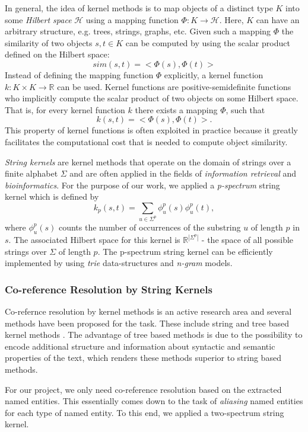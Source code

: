 In general, the idea of kernel methods is to map objects of a
distinct type $K$ into some \textit{Hilbert space} $\mathcal{H}$ using a mapping function $\Phi :
K \rightarrow \mathcal{H}$. Here, $K$ can have an arbitrary structure, e.g. trees, strings,
graphs, etc. Given such a mapping $\Phi$ the similarity of two objects $s,t \in K$ can be computed
by using the scalar product defined on the Hilbert space:
\[sim(s,t) = <\Phi(s),\Phi(t)>\]
Instead of defining the mapping function $\Phi$ explicitly, a kernel function $k : K \times K
\rightarrow \mathbb{R}$ can be used. Kernel functions are positive-semidefinite functions
who implicitly compute the scalar product of two objects on some Hilbert space. That is, for every
kernel function $k$ there exists a mapping $\Phi$, such that
\[k(s,t) = <\Phi(s),\Phi(t)>.\]
This property of kernel functions is often exploited in practice because it greatly facilitates the
computational cost that is needed to compute object similarity.

\textit{String kernels} are kernel methods  that operate on the domain of strings over
a finite alphabet $\Sigma$ and are often applied in the fields of \textit{information
retrieval} and \textit{bioinformatics}. For the purpose of our work, we applied a
\textit{p-spectrum} string kernel  which is defined by
\[k_p(s,t) = \sum_{u \in \Sigma^p}{\phi_u^p(s)\phi_u^p(t)},\]
where $\phi_u^p(s)$ counts the number of occurrences of the substring $u$ of length $p$ in $s$. The
associated Hilbert space for this kernel is $\mathbb{R}^{|\Sigma^p|}$ - the space of all possible
strings over $\Sigma$ of length $p$. The p-spectrum string kernel can be efficiently implemented by using \textit{trie} data-structures and \textit{n-gram} models.

\subsubsection{Co-reference Resolution by String Kernels}
\label{sec:co_reference_resolution_by_string_kernels}
Co-refernce resolution by kernel methods is an active research area and several methods have been proposed for the task. These include string and tree based kernel methods \cite{string_kernel_coref}.
The advantage of tree based methods is due to the possibility to encode additional structure and information about syntactic and semantic properties of the text, which renders these methods superior to string based methods.

For our project, we only need co-reference resolution based on the extracted named entities. This essentially comes down to the task of \textit{aliasing} named entities for each type of named entity. To this end, we applied a two-spectrum string kernel. 

